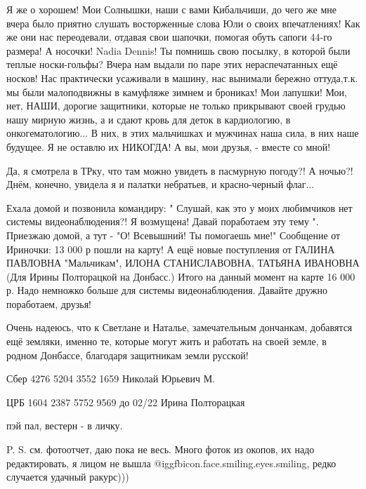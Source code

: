 
Я же о хорошем! Мои Солнышки, наши с вами Кибальчиши, до чего же мне вчера было
приятно слушать восторженные слова Юли о своих впечатлениях! Как же они нас
переодевали, отдавая свои шапочки, помогая обуть сапоги 44-го размера! А
носочки! Nadia Dennis! Ты помнишь свою посылку, в которой были теплые
носки-гольфы? Вчера нам выдали по паре этих нераспечатанных ещё носков! Нас
практически усаживали в машину, нас вынимали бережно оттуда,т.к. мы были
малоподвижны в камуфляже зимнем и брониках! Мои лапушки! Мои, нет, НАШИ,
дорогие защитники, которые не только прикрывают своей грудью нашу мирную жизнь,
а и сдают кровь для деток в кардиологию, в онкогематологию... В них, в этих
мальчишках и мужчинах  наша сила, в них наше будущее. Я не оставлю их НИКОГДА!
А вы, мои друзья, - вместе со мной! 


Да, я смотрела в ТРку, что там можно увидеть в пасмурную погоду?! А ночью?!
Днём, конечно, увидела я и палатки небратьев, и красно-черный флаг...

Ехала домой и позвонила командиру: " Слушай, как это у моих любимчиков нет
системы видеонаблюдения?! Я возмущена! Давай поработаем эту тему ". Приезжаю
домой, а тут - "О! Всевышний! Ты помогаешь мне!" Сообщение от Ириночки: 13 000
р пошли на карту! А ещё новые поступления от ГАЛИНА ПАВЛОВНА "Мальчикам", ИЛОНА
СТАНИСЛАВОВНА, ТАТЬЯНА ИВАНОВНА (Для Ирины Полторацкой на Донбасс.) Итого на
данный момент на карте 16 000 р. Надо немножко больше для системы
видеонаблюдения. Давайте дружно поработаем, друзья!

Очень надеюсь, что к Светлане и Наталье, замечательным дончанкам, добавятся ещё
земляки, именно те, которые могут жить и работать на своей земле, в родном
Донбассе, благодаря защитникам земли русской!

Сбер 4276 5204 3552 1659 Николай Юрьевич М.

ЦРБ 1604 2387 5752 9569 до 02/22 Ирина Полторацкая

пэй пал, вестерн - в личку.

P. S. см. фотоотчет, даю пока не весь. Много фоток из окопов, их надо
редактировать, я лицом не вышла @igg{fbicon.face.smiling.eyes.smiling}, редко случается удачный ракурс)))

